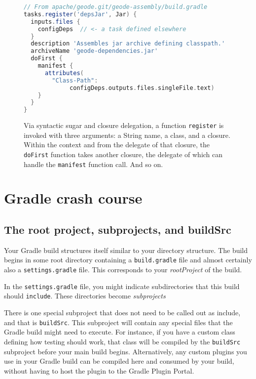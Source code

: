 \documentclass[]{article}
\theoremstyle{definition}
\begin{document}
\begin{figure}[h]
  \centering
  \begin{lstlisting}[language=Groovy]
// From apache/geode.git/geode-assembly/build.gradle
tasks.register('depsJar', Jar) {
  inputs.files {
    configDeps  // <- a task defined elsewhere
  }
  description 'Assembles jar archive defining classpath.'
  archiveName 'geode-dependencies.jar'
  doFirst {
    manifest {
      attributes(
        "Class-Path":
             configDeps.outputs.files.singleFile.text)
    }
  }
}
  \end{lstlisting}
  \caption{Via syntactic sugar and closure delegation,
  a function \texttt{register} is invoked with three arguments: a String name, a class, and a closure.
  Within the context and from the delegate of that closure,
    the \texttt{doFirst} function takes another closure,
    the delegate of which can handle the \texttt{manifest} function call.
  And so on.}
  \label{fig:keywords}
\end{figure}
  
\section{Gradle crash course}

\subsection{The root project, subprojects, and buildSrc}

Your Gradle build structures itself similar to your directory structure.
The build begins in some root directory containing a \texttt{build.gradle} file and almost certainly also a \texttt{settings.gradle} file.
This corresponds to your \emph{rootProject} of the build.

In the \texttt{settings.gradle} file, you might indicate subdirectories that this build should \texttt{include}.
These directories become \emph{subprojects}

There is one special subproject that does not need to be called out as include, and that is \texttt{buildSrc}.
This subproject will contain any special files that the Gradle build might need to execute.
For instance, if you have a custom class defining how testing should work, that class will be compiled by the \texttt{buildSrc} subproject before your main build begins.
Alternatively, any custom plugins you use in your Gradle build can be compiled here and consumed by your build, without having to host the plugin to the Gradle Plugin Portal.
\end{document}
